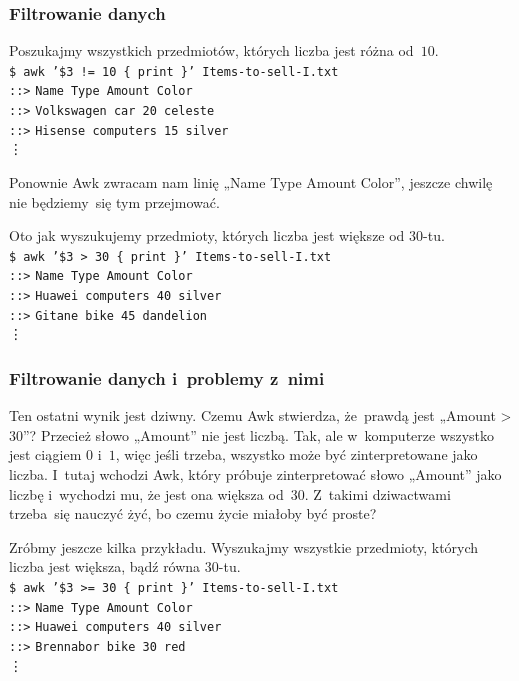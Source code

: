 \documentclass[10pt,t]{beamer}
\begin{document}
\begin{frame}
  \frametitle{Filtrowanie danych}


  Poszukajmy wszystkich przedmiotów, których liczba jest różna
  od~$10$. \\
  \texttt{\$ awk '\$3 != 10 \{ print \}' Items-to-sell-I.txt} \\
  \texttt{::>} \texttt{Name Type Amount Color} \\
  \texttt{::>} \texttt{Volkswagen car 20 celeste} \\
  \texttt{::>} \texttt{Hisense computers 15 silver} \\
  \hspace{3em} \vdots

  Ponownie Awk zwracam nam linię „Name Type Amount Color”, jeszcze chwilę
  nie będziemy~się tym przejmować.

  Oto jak wyszukujemy przedmioty, których liczba jest większe od $30$-tu. \\
  \texttt{\$ awk '\$3 > 30 \{ print \}' Items-to-sell-I.txt} \\
  \texttt{::>} \texttt{Name Type Amount Color} \\
  \texttt{::>} \texttt{Huawei computers 40 silver} \\
  \texttt{::>} \texttt{Gitane bike 45 dandelion} \\
  \hspace{3em} \vdots

\end{frame}





\begin{frame}
  \frametitle{Filtrowanie danych i~problemy z~nimi}


  Ten ostatni wynik jest dziwny. Czemu Awk stwierdza, że~prawdą jest
  „Amount > 30”? Przecież słowo „Amount” nie jest liczbą. Tak, ale
  w~komputerze wszystko jest ciągiem $0$ i~$1$, więc jeśli trzeba, wszystko
  może być zinterpretowane jako liczba. I~tutaj wchodzi Awk, który próbuje
  zinterpretować słowo „Amount” jako liczbę i~wychodzi mu, że jest ona
  większa od~$30$. Z~takimi dziwactwami trzeba~się nauczyć żyć, bo czemu
  życie miałoby być proste?

  Zróbmy jeszcze kilka przykładu. Wyszukajmy wszystkie przedmioty, których
  liczba jest większa, bądź równa $30$-tu. \\
  \texttt{\$ awk '\$3 >= 30 \{ print \}' Items-to-sell-I.txt} \\
  \texttt{::>} \texttt{Name Type Amount Color} \\
  \texttt{::>} \texttt{Huawei computers 40 silver} \\
  \texttt{::>} \texttt{Brennabor bike 30 red} \\
  \hspace{3em} \vdots

\end{frame}
\end{document}
